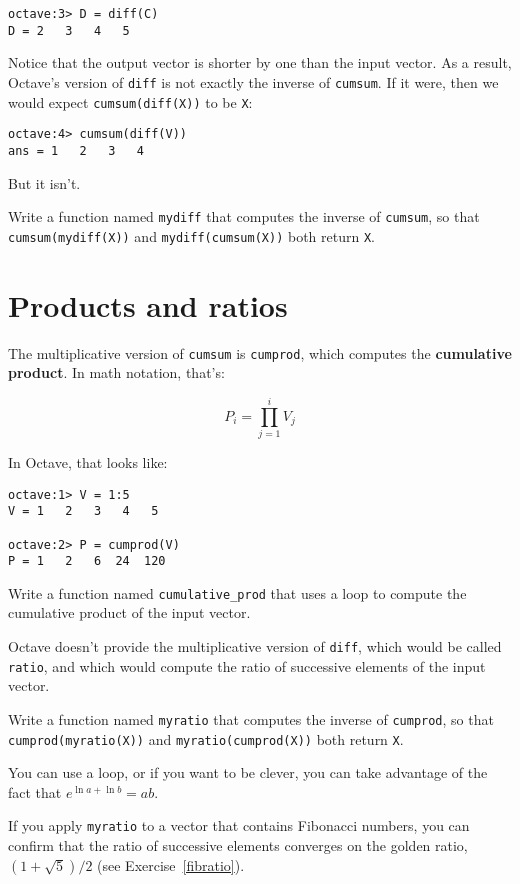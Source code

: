 \begin{verbatim}
octave:3> D = diff(C)
D = 2   3   4   5
\end{verbatim}

Notice that the output vector is shorter by one than the input
vector. As a result, Octave's version of {\tt diff} is not
exactly the inverse of {\tt cumsum}. If it were, then we would
expect {\tt cumsum(diff(X))} to be {\tt X}:

\begin{verbatim}
octave:4> cumsum(diff(V))
ans = 1   2   3   4
\end{verbatim}

But it isn't.

\begin{ex}
Write a function named {\tt mydiff} that computes the
inverse of {\tt cumsum}, so that {\tt cumsum(mydiff(X))} and
{\tt mydiff(cumsum(X))} both
return {\tt X}.
\end{ex}


\section{Products and ratios}

The multiplicative version of {\tt cumsum} is {\tt cumprod},
which computes the {\bf cumulative product}. In math notation,
that's:

\[ P_i = \prod_{j=1}^i V_j \]

In Octave, that looks like:

\begin{verbatim}
octave:1> V = 1:5
V = 1   2   3   4   5

octave:2> P = cumprod(V)
P = 1   2   6  24  120
\end{verbatim}

\begin{ex}
Write a function named {\tt cumulative\_prod} that uses
a loop to compute the cumulative product of the input vector.
\end{ex}

Octave doesn't provide the multiplicative version
of {\tt diff}, which would be called {\tt ratio}, and which would
compute the ratio of successive elements of the input vector.

\begin{ex}
Write a function named {\tt myratio} that computes the
inverse of {\tt cumprod}, so that {\tt cumprod(myratio(X))} and
{\tt myratio(cumprod(X))} both
return {\tt X}.

You can use a loop, or if you want to be clever, you can take
advantage of the fact that $e^{\ln a + \ln b} = a b$.

If you apply {\tt myratio} to a vector that contains Fibonacci
numbers, you can confirm that the ratio of successive elements
converges on the golden ratio, $(1+\sqrt{5})/2$ (see
Exercise~\ref{fibratio}).
\end{ex}



